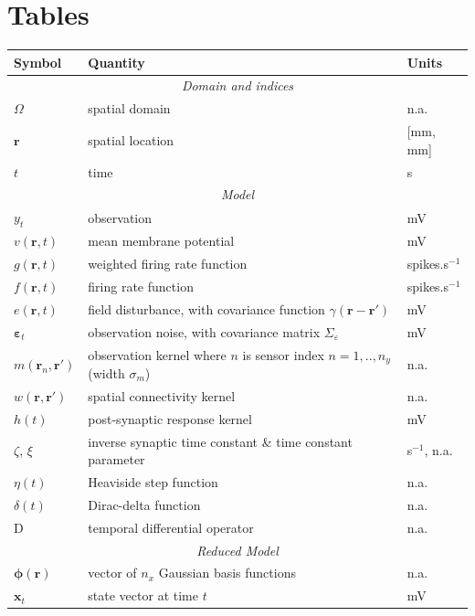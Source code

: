 \documentclass[5p,authoryear]{elsarticle}
\begin{document}
 


\section*{Tables}
\begin{table}[!ht]
\begin{tabular}{|l|l|l|}
	\hline
	\textbf{Symbol} & \textbf{Quantity} & \textbf{Units}\\
	\hline
	\multicolumn{3}{|c|}{\emph{Domain and indices}}\\
	\hline
	$\Omega$ & spatial domain & n.a.\\
	$\mathbf{r}$ & spatial location & [mm, mm]\\
	$t$ & time & s\\
	\hline
	\multicolumn{3}{|c|}{\emph{Model}}\\
	\hline
    $y_t$ & observation & mV\\
    $v(\mathbf{r},t)$ & mean membrane potential & mV \\
	$g(\mathbf{r},t)$ & weighted firing rate function & spikes.s$^{-1}$\\
	$f(\mathbf{r},t)$ & firing rate function & spikes.s$^{-1}$\\
	$e(\mathbf{r},t)$ & field disturbance, with covariance function $\gamma(\mathbf r-\mathbf r')$ & mV\\
	$\boldsymbol\varepsilon_t$ & observation noise, with covariance matrix $\Sigma_\varepsilon$ & mV\\
	$m(\mathbf{r}_n,\mathbf{r}')$ & observation kernel where $n$ is sensor index $n=1,..,n_y$ (width $\sigma_m$) & n.a. \\
	$w(\mathbf{r},\mathbf{r}')$ & spatial connectivity kernel & n.a.\\
	$h(t)$ & post-synaptic response kernel & mV\\
	$\zeta$, $\xi$ & inverse synaptic time constant \& time constant parameter & s$^{-1}$, n.a.\\
	$\eta(t)$ & Heaviside step function & n.a.\\
	$\delta(t)$ & Dirac-delta function & n.a.\\
	$\textrm{D}$ & temporal differential operator & n.a.\\
	\hline
	\multicolumn{3}{|c|}{\emph{Reduced Model}} \\
	\hline
   	$\boldsymbol\phi(\mathbf{r})$ & vector of $n_x$ Gaussian basis functions & n.a.\\
   	$\mathbf{x}_t$ & state vector at time $t$ & mV\\

\end{tabular}
\end{table}
\end{document}
